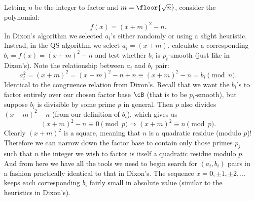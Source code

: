 \documentclass{report}
\begin{document}
Letting $n$ be the integer to factor and $m=\floor{\sqrt n}$, consider the polynomial:
\begin{equation}
    f(x)=(x+m)^2-n.
\end{equation}
In Dixon's algorithm we selected $a_i$'s either randomly or using a slight
heuristic. Instead, in the QS algorithm we select $a_i=(x+m)$, calculate a corresponding
$b_i=f(x)=(x+m)^2-n$ and test whether $b_i$ is $p_t$-smooth (just like in Dixon's).
Note the relationship between $a_i$ and $b_i$ pair:
\begin{equation}
    a_i^2
    = (x+m)^2
    = (x+m)^2 - n + n
    \equiv (x+m)^2 - n
    = b_i \pmod n.
\end{equation}
Identical to the congruence relation from Dixon's.
Recall that we want the $b_i$'s to factor entirely over our chosen factor base $\cB$ (that is to be
$p_t$-smooth), but suppose $b_i$ is divisible by some prime $p$ in general. Then $p$ also divides
$(x+m)^2-n$ (from our definition of $b_i$), which gives us
\begin{equation}
    (x+m)^2 - n \equiv 0 \pmod p \Rightarrow
    (x+m)^2 \equiv n \pmod p.
\end{equation}
Clearly $(x+m)^2$ is a square, meaning that $n$ is a quadratic residue (modulo $p$)!
Therefore we can narrow down the factor base to contain only those primes $p_j$ such that
$n$ the integer we wish to factor is itself a quadratic residue modulo $p$.
And from here we have all the tools we need to begin search for $(a_i,b_i)$ pairs in a fashion
practically identical to that in Dixon's. The sequence $x=0,\pm 1,\pm 2,\ldots$ keeps each
corresponding $b_i$ fairly small in absolute value (similar to the heuristics in Dixon's).
\end{document}
